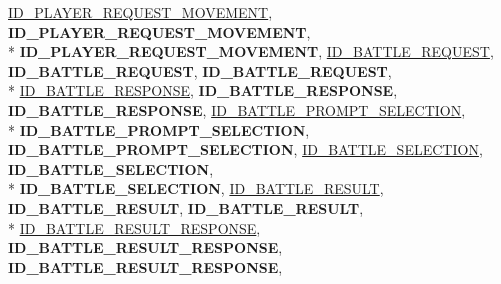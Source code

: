 \begin{DoxyCompactItemize}
\hyperlink{namespace_champ_net_plugin_a2ade5cfa7cf6c25ab7236c6b54a57821abaa5b813ea0118cdccbb8f80d461fea8}{I\-D\-\_\-\-P\-L\-A\-Y\-E\-R\-\_\-\-R\-E\-Q\-U\-E\-S\-T\-\_\-\-M\-O\-V\-E\-M\-E\-N\-T}, 
{\bfseries I\-D\-\_\-\-P\-L\-A\-Y\-E\-R\-\_\-\-R\-E\-Q\-U\-E\-S\-T\-\_\-\-M\-O\-V\-E\-M\-E\-N\-T}, 
\\*
{\bfseries I\-D\-\_\-\-P\-L\-A\-Y\-E\-R\-\_\-\-R\-E\-Q\-U\-E\-S\-T\-\_\-\-M\-O\-V\-E\-M\-E\-N\-T}, 
\hyperlink{namespace_champ_net_plugin_a2ade5cfa7cf6c25ab7236c6b54a57821a1099c58a5b9ad43616e67c5865ce539a}{I\-D\-\_\-\-B\-A\-T\-T\-L\-E\-\_\-\-R\-E\-Q\-U\-E\-S\-T}, 
{\bfseries I\-D\-\_\-\-B\-A\-T\-T\-L\-E\-\_\-\-R\-E\-Q\-U\-E\-S\-T}, 
{\bfseries I\-D\-\_\-\-B\-A\-T\-T\-L\-E\-\_\-\-R\-E\-Q\-U\-E\-S\-T}, 
\\*
\hyperlink{namespace_champ_net_plugin_a2ade5cfa7cf6c25ab7236c6b54a57821a4d61a30352b41b284f20eeb6d46d0b18}{I\-D\-\_\-\-B\-A\-T\-T\-L\-E\-\_\-\-R\-E\-S\-P\-O\-N\-S\-E}, 
{\bfseries I\-D\-\_\-\-B\-A\-T\-T\-L\-E\-\_\-\-R\-E\-S\-P\-O\-N\-S\-E}, 
{\bfseries I\-D\-\_\-\-B\-A\-T\-T\-L\-E\-\_\-\-R\-E\-S\-P\-O\-N\-S\-E}, 
\hyperlink{namespace_champ_net_plugin_a2ade5cfa7cf6c25ab7236c6b54a57821a1ce06c939b64517c251a1cc36168837f}{I\-D\-\_\-\-B\-A\-T\-T\-L\-E\-\_\-\-P\-R\-O\-M\-P\-T\-\_\-\-S\-E\-L\-E\-C\-T\-I\-O\-N}, 
\\*
{\bfseries I\-D\-\_\-\-B\-A\-T\-T\-L\-E\-\_\-\-P\-R\-O\-M\-P\-T\-\_\-\-S\-E\-L\-E\-C\-T\-I\-O\-N}, 
{\bfseries I\-D\-\_\-\-B\-A\-T\-T\-L\-E\-\_\-\-P\-R\-O\-M\-P\-T\-\_\-\-S\-E\-L\-E\-C\-T\-I\-O\-N}, 
\hyperlink{namespace_champ_net_plugin_a2ade5cfa7cf6c25ab7236c6b54a57821aaf35bd9b65c9b7d548147fbd85717bf9}{I\-D\-\_\-\-B\-A\-T\-T\-L\-E\-\_\-\-S\-E\-L\-E\-C\-T\-I\-O\-N}, 
{\bfseries I\-D\-\_\-\-B\-A\-T\-T\-L\-E\-\_\-\-S\-E\-L\-E\-C\-T\-I\-O\-N}, 
\\*
{\bfseries I\-D\-\_\-\-B\-A\-T\-T\-L\-E\-\_\-\-S\-E\-L\-E\-C\-T\-I\-O\-N}, 
\hyperlink{namespace_champ_net_plugin_a2ade5cfa7cf6c25ab7236c6b54a57821a744cf8458d36d27da738fcf6ba76001c}{I\-D\-\_\-\-B\-A\-T\-T\-L\-E\-\_\-\-R\-E\-S\-U\-L\-T}, 
{\bfseries I\-D\-\_\-\-B\-A\-T\-T\-L\-E\-\_\-\-R\-E\-S\-U\-L\-T}, 
{\bfseries I\-D\-\_\-\-B\-A\-T\-T\-L\-E\-\_\-\-R\-E\-S\-U\-L\-T}, 
\\*
\hyperlink{namespace_champ_net_plugin_a2ade5cfa7cf6c25ab7236c6b54a57821a0400430dae2bfdb56c3c5be84d5fc2b1}{I\-D\-\_\-\-B\-A\-T\-T\-L\-E\-\_\-\-R\-E\-S\-U\-L\-T\-\_\-\-R\-E\-S\-P\-O\-N\-S\-E}, 
{\bfseries I\-D\-\_\-\-B\-A\-T\-T\-L\-E\-\_\-\-R\-E\-S\-U\-L\-T\-\_\-\-R\-E\-S\-P\-O\-N\-S\-E}, 
{\bfseries I\-D\-\_\-\-B\-A\-T\-T\-L\-E\-\_\-\-R\-E\-S\-U\-L\-T\-\_\-\-R\-E\-S\-P\-O\-N\-S\-E}, 

\end{DoxyCompactItemize}
